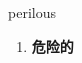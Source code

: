 
\begin{frame}
{\huge perilous}
\begin{center}
\begin{enumerate}\Large
  \item \textbf{危险的}
\end{enumerate}
\end{center}
\end{frame}
